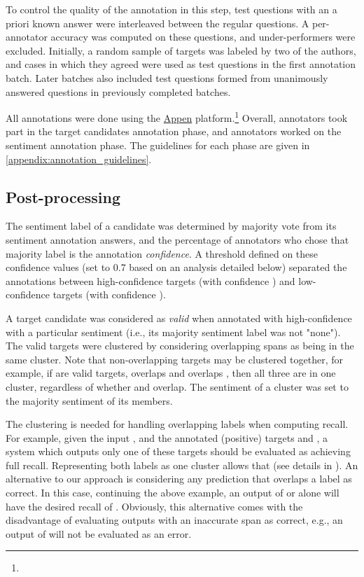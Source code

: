 To control the quality of the annotation in this step, 
test questions with an a priori known answer were 
interleaved 
between
the regular questions. 
A per-annotator accuracy was computed on these questions, and under-performers were excluded.
Initially, a random sample of targets was labeled by two of the authors, and cases in which they agreed were used as test questions in the first annotation batch.
Later batches also included test questions formed from unanimously answered questions in previously completed batches.

All annotations were done using the \href{www.appen.com}{Appen} platform.\footnote{}
Overall,  annotators took part in the target candidates annotation phase, and  annotators worked on the sentiment annotation phase. The guidelines for each phase are given in \supp \ref{appendix:annotation_guidelines}.

\subsection{Post-processing}

The 
sentiment label 
of a candidate 
was determined by majority vote from its sentiment annotation answers, and the percentage of annotators who chose that majority label is the annotation \emph{confidence}.
A threshold  defined on these confidence values (set to 0.7 based on an analysis detailed below) separated the annotations between high-confidence targets (with confidence ) and low-confidence targets (with confidence ). 

A target candidate was considered as \emph{valid} when annotated with high-confidence with a particular sentiment (i.e., its majority sentiment label was not "none"). 
The valid targets were clustered by considering overlapping spans as being in the same cluster. Note 
that non-overlapping targets may be clustered together, for example, if  are valid targets,  overlaps  and  overlaps , then all three are in one cluster, regardless of whether  and  overlap. The sentiment of a cluster was set to the majority sentiment of its members.

The clustering is needed for handling overlapping labels when computing recall. For example, given 
the input , and the annotated (positive) targets  and , a system which outputs only one of these targets should be evaluated as achieving full recall. 
Representing both labels as one cluster allows that (see details in ).
An alternative to our approach is considering any prediction that overlaps a label as correct. In this case, continuing the above example, an output of  or  alone will have the desired recall of . 
Obviously, this alternative comes with the disadvantage of evaluating outputs with an inaccurate span as correct, e.g., an output of  will not be evaluated as an error.



